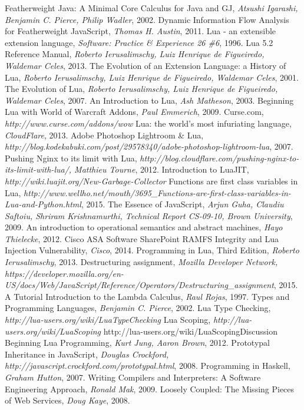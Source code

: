 \begin{thebibliography}{10}

 Featherweight Java: A Minimal Core Calculus for Java and GJ, {\it Atsushi Igarashi, Benjamin C. Pierce, Philip Wadler}, 2002.
 Dynamic Information Flow Analysis for Featherweight JavaScript, {\it Thomas H. Austin}, 2011.
 Lua - an extensible extension language, {\it  Software: Practice \& Experience 26 \#6}, 1996.
 Lua 5.2 Reference Manual, {\it Roberto Ierusalimschy, Luiz Henrique de Figueiredo, Waldemar Celes}, 2013.
 The Evolution of an Extension Language: a History of Lua, {\it  Roberto Ierusalimschy, Luiz Henrique de Figueiredo, Waldemar Celes}, 2001.
 The Evolution of Lua, {\it Roberto Ierusalimschy, Luiz Henrique de Figueiredo, Waldemar Celes}, 2007.
 An Introduction to Lua, {\it  Ash Matheson}, 2003.
 Beginning Lua with World of Warcraft Addons, {\it Paul Emmerich}, 2009.
 Curse.com, {\it http://www.curse.com/addons/wow}
 Lua: the world's most infuriating language, {\it CloudFlare}, 2013.
 Adobe Photoshop Lightroom \& Lua, {\it http://blog.kodekabuki.com/post/29578340/adobe-photoshop-lightroom-lua}, 2007.
 Pushing Nginx to its limit with Lua,  {\it http://blog.cloudflare.com/pushing-nginx-to-its-limit-with-lua/, Matthieu Tourne}, 2012.
 Introduction to LuaJIT, {\it http://wiki.luajit.org/New-Garbage-Collector}
 Functions are first class variables in Lua, {\it http://www.wellho.net/mouth/3695\_Functions-are-first-class-variables-in-Lua-and-Python.html}, 2015.
 The Essence of JavaScript, {\it Arjun Guha, Claudiu Saftoiu, Shriram Krishnamurthi, Technical Report CS-09-10, Brown University}, 2009.
 An introduction to operational semantics and abstract machines, {\it Hayo Thielecke}, 2012.
 Cisco ASA Software SharePoint RAMFS Integrity and Lua Injection Vulnerability, {\it Cisco}, 2014.
 Programming in Lua, Third Edition, {\it Roberto Ierusalimschy}, 2013.
Destructuring assignment, {\it Mozilla Developer Network, https://developer.mozilla.org/en-US/docs/Web/JavaScript/Reference/Operators/Destructuring\_assignment}, 2015.
 A Tutorial Introduction to the Lambda Calculus, {\it Raul Rojas}, 1997.
 Types and Programming Languages, {\it Benjamin C. Pierce}, 2002.
 Lua Type Checking, {\it http://lua-users.org/wiki/LuaTypeChecking}
 Lua Scoping, {\it http://lua-users.org/wiki/LuaScoping}
 http://lua-users.org/wiki/LuaScopingDiscussion
 Beginning Lua Programming, {\it Kurt Jung, Aaron Brown}, 2012.
 Prototypal Inheritance in JavaScript, {\it Douglas Crockford, http://javascript.crockford.com/prototypal.html}, 2008.
 Programming in Haskell, {\it Graham Hutton}, 2007.
 Writing Compilers and Interpreters: A Software Engineering Approach, {\it Ronald Mak}, 2009.
 Loosely Coupled: The Missing Pieces of Web Services, {\it Doug Kaye}, 2008.
\\

\end{thebibliography}
